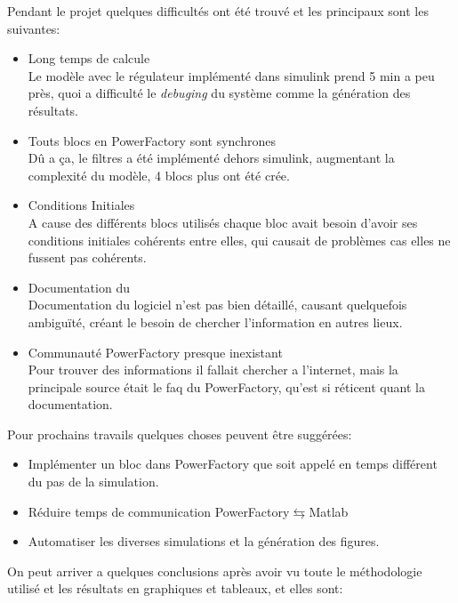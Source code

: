 
\newpage
{}
Pendant le projet quelques difficultés ont été trouvé et les principaux sont les suivantes:

\begin{itemize}
	\item Long temps de calcule\\
	Le modèle avec le régulateur implémenté dans simulink prend 5 min a peu près, quoi a difficulté le \textit{debuging} du système comme la génération des résultats.\\ 
	\item Touts blocs en PowerFactory sont synchrones\\
	Dû a ça, le filtres a été implémenté dehors simulink, augmentant la complexité du modèle, 4 blocs plus ont été crée.\\
	\item Conditions Initiales\\ 
	A cause des différents blocs utilisés chaque bloc avait besoin d'avoir ses conditions initiales cohérents entre elles, qui causait de problèmes cas elles ne fussent pas cohérents.\\
	\item Documentation du \powerfactory\\
	Documentation du logiciel n'est pas bien détaillé, causant quelquefois ambiguïté, créant le besoin de chercher l'information en autres lieux.\\
	\item Communauté PowerFactory presque inexistant\\
	Pour trouver des informations il fallait chercher a l'internet, mais la principale source était le faq du PowerFactory, qu'est si réticent quant la documentation. 
\end{itemize}

Pour prochains travails quelques choses peuvent être suggérées:
\begin{itemize}
	\item Implémenter un bloc dans PowerFactory que soit appelé en temps différent du pas de la simulation.
	\item Réduire temps de communication PowerFactory$ \leftrightarrows $Matlab
	\item Automatiser les diverses simulations et la génération des figures.
\end{itemize}
\newpage
{}
On peut arriver a quelques conclusions après avoir vu toute le méthodologie utilisé et les résultats en graphiques et tableaux, et elles sont:

